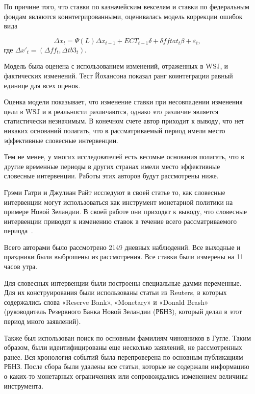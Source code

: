 \documentclass[14pt,a4paper, oneside]{extreport}
\def \dt{\delta}
\newcommand{\e}{\varepsilon}
\def \Dt{\Delta}
\theoremstyle{plain}              %
\theoremstyle{definition}         %
\begin{document}
По причине того, что ставки по казначейским векселям и ставки по федеральным фондам являются коинтегрированными, оценивалась модель коррекции ошибок вида 

\begin{equation}
\Dt x_t = \Psi(L) \Dt x_{t-1} + ECT_{t-1} \dt + \dt fftat_t \beta + \e_t,
\end{equation} где $\Dt x'_t = (\Dt ff_t, \Dt tb3_t)$.

Модель была оценена с использованием изменений, отраженных в WSJ, и фактических изменений. Тест Йохансона показал ранг коинтеграции равный единице для всех оценок. 

Оценка модели показывает, что изменение ставки при несовпадении изменения цели в WSJ и в реальности различаются, однако это различие является статистически незначимым. В конечном счете автор приходит к выводу, что нет никаких оснований полагать, что в рассматриваемый период имели место эффективные словесные интервенции. 

Тем не менее, у многих исследователей есть весомые основания полагать, что в другие временные периоды в других странах имели место эффективные словесные интервенции. Работы этих авторов будут рассмотрены ниже.

Грэми Гатри и Джулиан Райт исследуют в своей статье то, как словесные интервенции могут использоваться как инструмент монетарной политики на примере Новой Зеландии. В своей работе они приходят к выводу, что словесные интервенции приводят к изменению ставок в течение всего рассматриваемого периода~\cite{guthrie2000open}.

Всего авторами было рассмотрено 2149 дневных наблюдений. Все выходные и праздники были выброшены из рассмотрения. Все ставки были измерены на 11 часов утра. 

Для словесных интервенции были построены специальные дамми-переменные. Для их конструирования были использованы статьи из Reuters, в которых содержались слова «Reserve Bank», «Monetary» и «Donald Brash» (руководитель Резервного Банка Новой Зеландии (РБНЗ), который делал в этот период много заявлений).

Также был использован поиск по основным фамилиям чиновников в Гугле. Таким образом, были идентифицированы еще несколько заявлений, не рассмотренных ранее. Вся хронология событий была перепроверена по основным публикациям РБНЗ. После сбора были удалены все статьи, которые не содержали информацию о каких-то монетарных ограничениях или сопровождались изменением величины инструмента.
\end{document}
